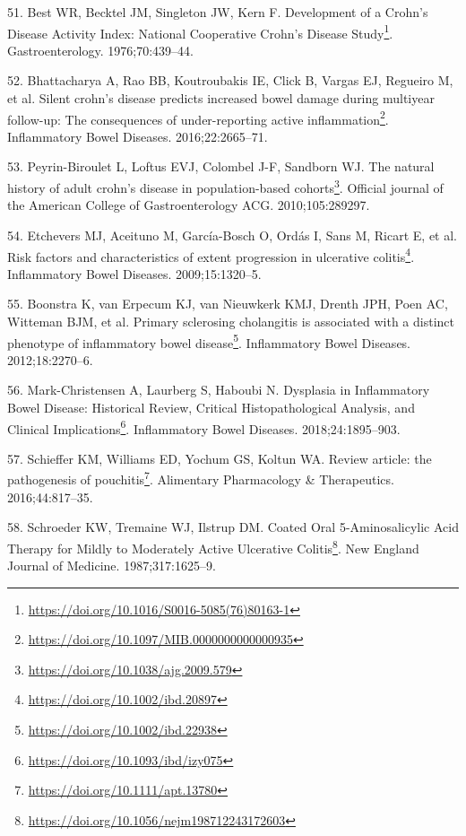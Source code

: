 \documentclass[
  a4paper,
]{book}
\DeclareRobustCommand{\href}[2]{#2\footnote{\url{#1}}}
\newlength{\cslhangindent}
\newlength{\cslentryspacingunit} %
\newenvironment{CSLReferences}[2] %
 {%
  \setlength{\parindent}{0pt}
  \ifodd #1
  \let\oldpar\par
  \def\par{\hangindent=\cslhangindent\oldpar}
  \fi
  \setlength{\parskip}{#2\cslentryspacingunit}
 }%
 {}
\begin{document}
\begin{CSLReferences}{0}{0}
\leavevmode{}%
51. Best WR, Becktel JM, Singleton JW, Kern F. \href{https://doi.org/10.1016/S0016-5085(76)80163-1}{Development of a Crohn's Disease Activity Index: National Cooperative Crohn's Disease Study}. Gastroenterology. 1976;70:439--44.

\leavevmode{}%
52. Bhattacharya A, Rao BB, Koutroubakis IE, Click B, Vargas EJ, Regueiro M, et al. \href{https://doi.org/10.1097/MIB.0000000000000935}{Silent crohn's disease predicts increased bowel damage during multiyear follow-up: The consequences of under-reporting active inflammation}. Inflammatory Bowel Diseases. 2016;22:2665--71.

\leavevmode{}%
53. Peyrin-Biroulet L, Loftus EVJ, Colombel J-F, Sandborn WJ. \href{https://doi.org/10.1038/ajg.2009.579}{The natural history of adult crohn's disease in population-based cohorts}. Official journal of the American College of Gastroenterology \textbar{} ACG. 2010;105:289297.

\leavevmode{}%
54. Etchevers MJ, Aceituno M, García-Bosch O, Ordás I, Sans M, Ricart E, et al. \href{https://doi.org/10.1002/ibd.20897}{Risk factors and characteristics of extent progression in ulcerative colitis}. Inflammatory Bowel Diseases. 2009;15:1320--5.

\leavevmode{}%
55. Boonstra K, van Erpecum KJ, van Nieuwkerk KMJ, Drenth JPH, Poen AC, Witteman BJM, et al. \href{https://doi.org/10.1002/ibd.22938}{Primary sclerosing cholangitis is associated with a distinct phenotype of inflammatory bowel disease}. Inflammatory Bowel Diseases. 2012;18:2270--6.

\leavevmode{}%
56. Mark-Christensen A, Laurberg S, Haboubi N. \href{https://doi.org/10.1093/ibd/izy075}{Dysplasia in Inflammatory Bowel Disease: Historical Review, Critical Histopathological Analysis, and Clinical Implications}. Inflammatory Bowel Diseases. 2018;24:1895--903.

\leavevmode{}%
57. Schieffer KM, Williams ED, Yochum GS, Koltun WA. \href{https://doi.org/10.1111/apt.13780}{Review article: the pathogenesis of pouchitis}. Alimentary Pharmacology \& Therapeutics. 2016;44:817--35.

\leavevmode{}%
58. Schroeder KW, Tremaine WJ, Ilstrup DM. \href{https://doi.org/10.1056/nejm198712243172603}{Coated Oral 5-Aminosalicylic Acid Therapy for Mildly to Moderately Active Ulcerative Colitis}. New England Journal of Medicine. 1987;317:1625--9.


\end{CSLReferences}
\end{document}
